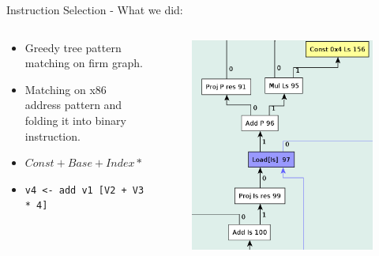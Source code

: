 \documentclass[en,16:9]{sdqbeamer}
\begin{document}
\begin{frame}{Instruction Selection - What we did:}
	\begin{columns}
		\begin{column}{0.4\textwidth}
			\begin{itemize}
				\item Greedy tree pattern matching on firm graph.
				\item Matching on x86 address pattern and folding it into binary instruction.
				\item $Const + Base + Index * Scale$
				\vspace{2em}
				\item \texttt{v4 <- add v1 [V2 + V3 * 4]}
			\end{itemize}
		\end{column}
		\begin{column}{0.6\textwidth}
			\vspace{-1em}
			\begin{figure}
				\centering
				\includegraphics[scale=0.27]{images/memory-match-firm-graph.png}
			\end{figure}
		\end{column}
	\end{columns}
\end{frame}
\end{document}
